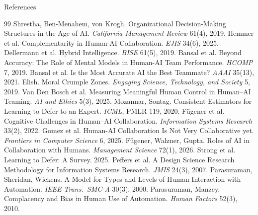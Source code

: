 \documentclass[aspectratio=169,11pt]{beamer}
\begin{document}
\appendix
\begin{frame}[allowframebreaks]{References}
  \tiny
  \begin{thebibliography}{99}
     Shrestha, Ben-Menahem, von Krogh. Organizational Decision-Making Structures in the Age of AI. \emph{California Management Review} 61(4), 2019.
     Hemmer et al. Complementarity in Human-AI Collaboration. \emph{EJIS} 34(6), 2025.
     Dellermann et al. Hybrid Intelligence. \emph{BISE} 61(5), 2019.
     Bansal et al. Beyond Accuracy: The Role of Mental Models in Human-AI Team Performance. \emph{HCOMP} 7, 2019.
     Bansal et al. Is the Most Accurate AI the Best Teammate? \emph{AAAI} 35(13), 2021.
     Elish. Moral Crumple Zones. \emph{Engaging Science, Technology, and Society} 5, 2019.
     Van Den Bosch et al. Measuring Meaningful Human Control in Human--AI Teaming. \emph{AI and Ethics} 5(3), 2025.
     Mozannar, Sontag. Consistent Estimators for Learning to Defer to an Expert. \emph{ICML}, PMLR 119, 2020.
     F\"ugener et al. Cognitive Challenges in Human--AI Collaboration. \emph{Information Systems Research} 33(2), 2022.
     Gomez et al. Human-AI Collaboration Is Not Very Collaborative yet. \emph{Frontiers in Computer Science} 6, 2025.
     F\"ugener, Walzner, Gupta. Roles of AI in Collaboration with Humans. \emph{Management Science} 72(1), 2026.
     Strong et al. Learning to Defer: A Survey. 2025.
     Peffers et al. A Design Science Research Methodology for Information Systems Research. \emph{JMIS} 24(3), 2007.
     Parasuraman, Sheridan, Wickens. A Model for Types and Levels of Human Interaction with Automation. \emph{IEEE Trans.\ SMC-A} 30(3), 2000.
     Parasuraman, Manzey. Complacency and Bias in Human Use of Automation. \emph{Human Factors} 52(3), 2010.
  \end{thebibliography}
\end{frame}
\end{document}
